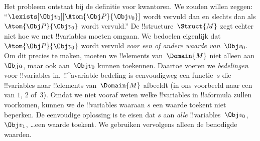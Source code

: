 \documentclass[../../../include/open-logic-section]{subfiles}
\begin{document}
Het probleem ontstaat bij de definitie voor kwantoren. We zouden
willen zeggen: ``$\lexists[\Obj v_0][\Atom{\Obj P}{\Obj v_0}]$ wordt
vervuld dan en slechts dan als $\Atom{\Obj P}{\Obj v_0}$ wordt
vervuld.'' De !!{structure}~$\Struct{M}$ zegt echter niet hoe we met
!!{variable}s moeten omgaan. We bedoelen eigenlijk dat
$\Atom{\Obj P}{\Obj v_0}$ wordt vervuld \emph{voor een of andere waarde
van~$\Obj v_0$}. Om dit precies te maken, moeten we !!{element}s
van~$\Domain{M}$ niet alleen aan $\Obj a$, maar ook aan~$\Obj v_0$
kunnen toekennen. Daartoe voeren we \emph{bedelingen} voor
!!{variable}s in.
!!^a{variable} bedeling is eenvoudigweg een functie~$s$ die
!!{variable}s naar !!{element}s van~$\Domain{M}$ afbeeldt (in ons
voorbeeld naar een van $1$, $2$ of~$3$). Omdat we niet vooraf weten
welke !!{variable}s in !!a{formula} zullen voorkomen, kunnen we de
!!{variable}s waaraan $s$ een waarde toekent niet beperken. De
eenvoudige oplossing is te eisen dat $s$ aan \emph{alle}
!!{variable}s~$\Obj v_0$, $\Obj v_1$, \dots\@ een waarde toekent. We
gebruiken vervolgens alleen de benodigde waarden.
\end{document}
